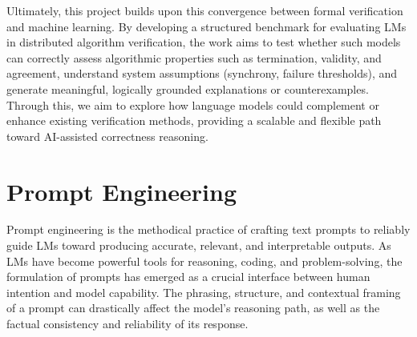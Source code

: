 Ultimately, this project builds upon this convergence between formal verification and machine learning.
By developing a structured benchmark for evaluating LMs in distributed algorithm verification, the work aims to test whether such models can correctly assess algorithmic properties such as termination, validity, and agreement, understand system assumptions (synchrony, failure thresholds), and generate meaningful, logically grounded explanations or counterexamples.
Through this, we aim to explore how language models could complement or enhance existing verification methods, providing a scalable and flexible path toward AI-assisted correctness reasoning.


\section{Prompt Engineering}

Prompt engineering is the methodical practice of crafting text prompts to reliably guide LMs toward producing accurate, relevant, and interpretable outputs. As LMs have become powerful tools for reasoning, coding, and problem-solving, the formulation of prompts has emerged as a crucial interface between human intention and model capability. The phrasing, structure, and contextual framing of a prompt can drastically affect the model’s reasoning path, as well as the factual consistency and reliability of its response.


